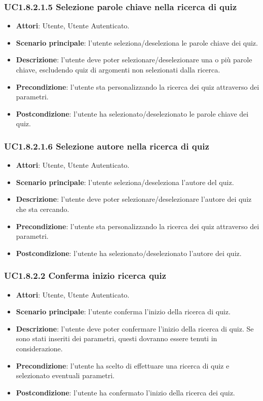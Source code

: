 \subsubsection{UC1.8.2.1.5 Selezione parole chiave nella ricerca di quiz}
\begin{itemize}
\item \textbf{Attori}: Utente, Utente Autenticato.
\item \textbf{Scenario principale}: l'utente seleziona/deseleziona le parole chiave dei quiz.
\item \textbf{Descrizione}: l'utente deve poter selezionare/deselezionare una o più parole chiave, escludendo quiz di argomenti non selezionati dalla ricerca.
\item \textbf{Precondizione}: l'utente sta personalizzando la ricerca dei quiz attraverso dei parametri.
\item \textbf{Postcondizione}: l'utente ha selezionato/deselezionato le parole chiave dei quiz.
\end{itemize}
\subsubsection{UC1.8.2.1.6 Selezione autore nella ricerca di quiz}
\begin{itemize}
\item \textbf{Attori}: Utente, Utente Autenticato.
\item \textbf{Scenario principale}: l'utente seleziona/deseleziona l'autore del quiz.
\item \textbf{Descrizione}: l'utente deve poter selezionare/deselezionare l'autore dei quiz che sta cercando.
\item \textbf{Precondizione}: l'utente sta personalizzando la ricerca dei quiz attraverso dei parametri.
\item \textbf{Postcondizione}: l'utente ha selezionato/deselezionato l'autore dei quiz.
\end{itemize}
\subsubsection{UC1.8.2.2 Conferma inizio ricerca quiz}
\begin{itemize}
\item \textbf{Attori}: Utente, Utente Autenticato.
\item \textbf{Scenario principale}: l'utente conferma l'inizio della ricerca di quiz.
\item \textbf{Descrizione}: l'utente deve poter confermare l'inizio della ricerca di  quiz. Se sono stati inseriti dei parametri, questi dovranno essere tenuti in considerazione.
\item \textbf{Precondizione}: l'utente ha scelto di effettuare una ricerca di quiz e selezionato eventuali parametri.
\item \textbf{Postcondizione}: l'utente ha confermato l'inizio della ricerca dei quiz.
\end{itemize}

